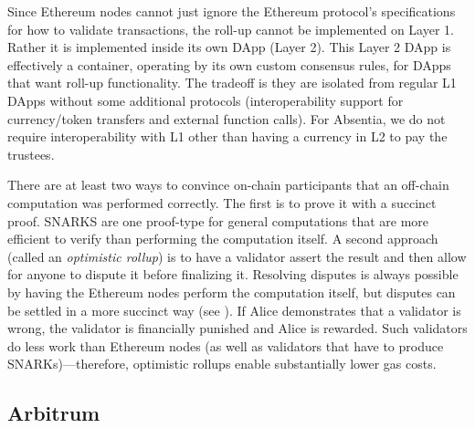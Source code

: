 Since Ethereum nodes cannot just ignore the Ethereum protocol's specifications for how to validate transactions, the roll-up cannot be implemented on Layer 1. Rather it is implemented inside its own DApp (Layer 2). This Layer 2 DApp is effectively a container, operating by its own custom consensus rules, for DApps that want roll-up functionality. The tradeoff is they are isolated from regular L1 DApps without some additional protocols (\eg interoperability support for currency/token transfers and external function calls). For Absentia, we do not require interoperability with L1 other than having a currency in L2 to pay the trustees.

There are at least two ways to convince on-chain participants that an off-chain computation was performed correctly. The first is to prove it with a succinct proof. SNARKS are one proof-type for general computations that are more efficient to verify than performing the computation itself. A second approach (called an \emph{optimistic rollup}) is to have a validator assert the result and then allow for anyone to dispute it before finalizing it. Resolving disputes is always possible by having the Ethereum nodes perform the computation itself, but disputes can be settled in a more succinct way (see \cite{KGCWF18}). If Alice demonstrates that a validator is wrong, the validator is financially punished and Alice is rewarded. Such validators do less work than Ethereum nodes (as well as validators that have to produce SNARKs)---therefore, optimistic rollups enable substantially lower gas costs.

\subsection{Arbitrum}

